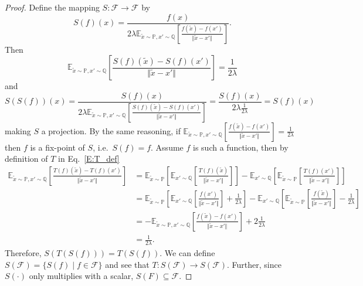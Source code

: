 \documentclass{article}
\begin{document}
\begin{proof}
  Define the mapping $S:\mathcal F\to\mathcal F$ by
  \[S(f)(x)=\frac{f(x)}{2\lambda\mathbb E_{\tilde x\sim\mathbb P,x'\sim\mathbb Q}\left[\frac{f(\tilde x)-f(x')}{\Vert\tilde x-x'\Vert}\right]}.\]
  Then
  \begin{equation}\label{E:s_equality}
  \mathbb E_{\tilde x\sim\mathbb P,x'\sim\mathbb Q}\left[\frac{S(f)(\tilde x)-S(f)(x')}{\Vert\tilde x-x'\Vert}\right]=\frac{1}{2\lambda}
  \end{equation}
  and
  \[S(S(f))(x)=\frac{S(f)(x)}{2\lambda\mathbb E_{\tilde x\sim\mathbb P,x'\sim\mathbb Q}\left[\frac{S(f)(\tilde x)-S(f)(x')}{\Vert\tilde x-x'\Vert}\right]}=\frac{S(f)(x)}{2\lambda\frac{1}{2\lambda}}=S(f)(x)\]
  making $S$ a projection.
  By the same reasoning, if $\mathbb E_{\tilde x\sim\mathbb P,x'\sim\mathbb Q}\left[\frac{f(\tilde x)-f(x')}{\Vert\tilde x-x'\Vert}\right]=\frac{1}{2\lambda}$
  then $f$ is a fix-point of $S$, i.e.\ $S(f)=f$.
  Assume $f$ is such a function, then by definition  of $T$ in Eq.\ \ref{E:T_def}
  \begin{align*}\mathbb E_{\tilde x\sim\mathbb P,x'\sim\mathbb Q}\left[\frac{T(f)(\tilde x)-T(f)(x')}{\Vert\tilde x-x'\Vert}\right]
   &=\mathbb E_{\tilde x\sim\mathbb P}\left[\mathbb E_{x'\sim\mathbb Q}\left[\frac{T(f)(\tilde x)}{\Vert\tilde x-x'\Vert}\right]\right]
   -\mathbb E_{x'\sim\mathbb Q}\left[\mathbb E_{\tilde x\sim\mathbb P}\left[\frac{T(f)(x')}{\Vert\tilde x-x'\Vert}\right]\right]\\
   &=\mathbb E_{\tilde x\sim\mathbb P}\left[\mathbb E_{x'\sim\mathbb Q}\left[\frac{f(x')}{\Vert\tilde x-x'\Vert}\right]+\frac{1}{2\lambda}\right]
   -\mathbb E_{x'\sim\mathbb Q}\left[\mathbb E_{\tilde x\sim\mathbb P}\left[\frac{f(\tilde x)}{\Vert\tilde x-x'\Vert}\right]-\frac{1}{2\lambda}\right]\\
   &=-\mathbb E_{\tilde x\sim\mathbb P,x'\sim\mathbb Q}\left[\frac{f(\tilde x)-f(x')}{\Vert\tilde x-x'\Vert}\right]+2\frac{1}{2\lambda}\\
   &=\frac{1}{2\lambda}.
  \end{align*}
  Therefore, $S(T(S(f)))=T(S(f))$. We can define $S(\mathcal F)=\{S(f)\mid f\in\mathcal F\}$ and see that $T:S(\mathcal F)\to S(\mathcal F)$.
  Further, since $S(\cdot)$ only multiplies with a scalar, $S(F)\subseteq\mathcal F$.


\end{proof}
\end{document}

